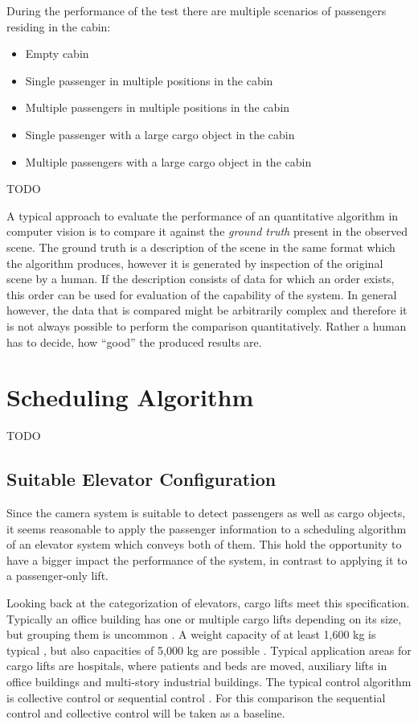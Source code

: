 During the performance of the test there are multiple scenarios
of passengers residing in the cabin:
\begin{itemize}
    \item Empty cabin
    \item Single passenger in multiple positions in the cabin
    \item Multiple passengers in multiple positions in the cabin
    \item Single passenger with a large cargo object in the cabin
    \item Multiple passengers with a large cargo object in the cabin
\end{itemize}
TODO

A typical approach to evaluate the performance of an 
quantitative algorithm in computer vision is to compare it against the \emph{ground truth} present in the observed scene.
The ground truth is a description of the scene in the same format which the algorithm produces, however it is generated by inspection of the original scene by a human.
If the description consists of data for which an order exists, this order can be used for evaluation of the capability of the system.
In general however, the data that is compared might be arbitrarily complex and therefore it is not always possible to perform the comparison quantitatively. Rather a human has to decide, how \enquote{good} the produced results are.


\section{Scheduling Algorithm}
TODO
\subsection{Suitable Elevator Configuration}
Since the camera system is suitable to detect passengers as well as cargo objects,
it seems reasonable to apply the passenger information 
to a scheduling algorithm of an elevator system which conveys both of them.
This hold the opportunity to have a bigger impact the performance of the system, 
in contrast to applying it to a passenger-only lift.

Looking back at the categorization of elevators, cargo lifts meet this specification.
Typically an office building has one or multiple cargo lifts depending on its size,
but grouping them is uncommon \autocite[][p.~167]{barney2016handbook}.
A weight capacity of at least 1,600 kg is typical \autocite[][p.~167]{barney2016handbook},
but also capacities of 5,000 kg are possible \autocite[][]{kone2017overview}.
Typical application areas for cargo lifts are hospitals, where patients and beds are moved,
auxiliary lifts in office buildings and multi-story industrial buildings.
The typical control algorithm is collective control or sequential control \autocite[][pp.~238,~244]{barney2016handbook}.
For this comparison the sequential control and collective control will be taken as a baseline.

